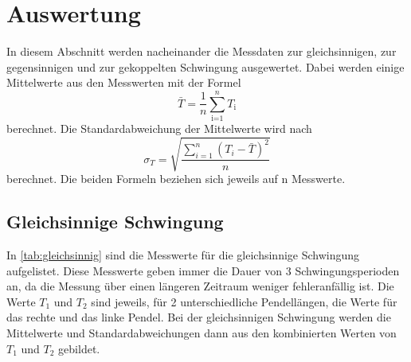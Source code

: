 \section{Auswertung}
\label{sec:Auswertung}
In diesem Abschnitt werden nacheinander die Messdaten zur gleichsinnigen, zur gegensinnigen und zur gekoppelten Schwingung ausgewertet. \newline
Dabei werden einige Mittelwerte aus den Messwerten mit der Formel
\begin{equation}
    \bar{T}=\frac{1}{n}\sum_{\textrm{i=1}}^n T_\textrm{i} 
    \label{eqn:mittelwert}
\end{equation}
\noindent
berechnet. \newline
Die Standardabweichung der Mittelwerte wird nach
\begin{equation}
    \sigma_T = \sqrt{\frac{\sum_{i=1}^{n}(T_i-\bar{T})^2}{n}}
    \label{eqn:standardabweichung}
\end{equation}
\noindent
berechnet. Die beiden Formeln beziehen sich jeweils auf n Messwerte.

\subsection{Gleichsinnige Schwingung}
\label{sec:gleichsinnig}

In \autoref{tab:gleichsinnig} sind die Messwerte für die gleichsinnige Schwingung aufgelistet. Diese Messwerte geben immer die Dauer von 3 Schwingungsperioden an, da die Messung über einen längeren Zeitraum weniger fehleranfällig ist. Die Werte $T_1$ und $T_2$ sind jeweils, für 2 unterschiedliche Pendellängen, die Werte für das rechte und das linke Pendel. Bei der gleichsinnigen Schwingung werden die Mittelwerte und Standardabweichungen dann aus den kombinierten Werten von $T_1$ und $T_2$ gebildet.    

